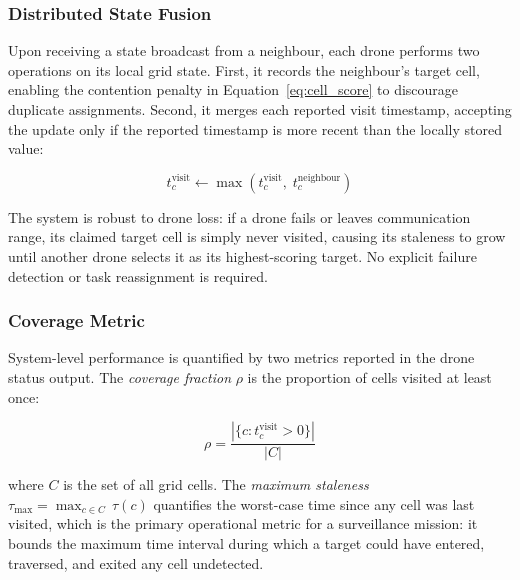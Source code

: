 \subsubsection{Distributed State Fusion}

Upon receiving a state broadcast from a neighbour, each drone performs two operations on its local grid state. First, it records the neighbour's target cell, enabling the contention penalty in Equation~\eqref{eq:cell_score} to discourage duplicate assignments. Second, it merges each reported visit timestamp, accepting the update only if the reported timestamp is more recent than the locally stored value:

\begin{equation}
    t_c^{\text{visit}} \leftarrow \max\!\left(t_c^{\text{visit}},\; t_c^{\text{neighbour}}\right)
    \label{eq:merge}
\end{equation}


The system is robust to drone loss: if a drone fails or leaves communication range, its claimed target cell is simply never visited, causing its staleness to grow until another drone selects it as its highest-scoring target. No explicit failure detection or task reassignment is required.

\subsubsection{Coverage Metric}

System-level performance is quantified by two metrics reported in the drone status output. The \emph{coverage fraction} $\rho$ is the proportion of cells visited at least once:

\begin{equation}
    \rho = \frac{|\{c : t_c^{\text{visit}} > 0\}|}{|C|}
    \label{eq:coverage}
\end{equation}

\noindent where $C$ is the set of all grid cells. The \emph{maximum staleness} $\tau_{\max} = \max_{c \in C}\, \tau(c)$ quantifies the worst-case time since any cell was last visited, which is the primary operational metric for a surveillance mission: it bounds the maximum time interval during which a target could have entered, traversed, and exited any cell undetected.



